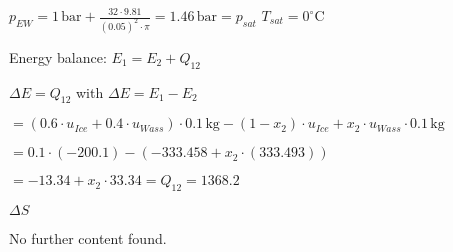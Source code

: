 \( p_{EW} = 1 \, \text{bar} + \frac{32 \cdot 9.81}{(0.05)^2 \cdot \pi} = 1.46 \, \text{bar} = p_{sat} \)  
\( T_{sat} = 0^\circ \text{C} \)  

Energy balance:  
\( E_1 = E_2 + Q_{12} \)  

\( \Delta E = Q_{12} \) with  
\( \Delta E = E_1 - E_2 \)  

\( = (0.6 \cdot u_{Ice} + 0.4 \cdot u_{Wass}) \cdot 0.1 \, \text{kg} - (1 - x_2) \cdot u_{Ice} + x_2 \cdot u_{Wass} \cdot 0.1 \, \text{kg} \)  

\( = 0.1 \cdot (-200.1) - (-333.458 + x_2 \cdot (333.493)) \)  

\( = -13.34 + x_2 \cdot 33.34 = Q_{12} = 1368.2 \)  

\( \Delta S \)  

No further content found.